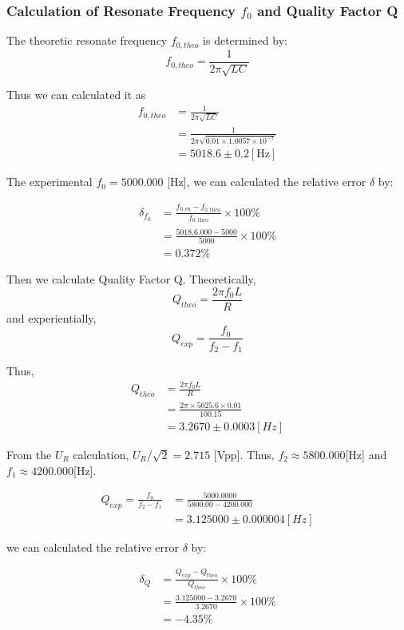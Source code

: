 \documentclass[a4paper]{article}
\begin{document}
\subsubsection{Calculation of Resonate Frequency $f_0$ and Quality Factor Q}

The theoretic resonate frequency $f_{0,theo}$ is determined by:
\begin{equation}
	f_{0,theo}=\frac{1}{2\pi \sqrt{LC}}
\end{equation}

Thus we can calculated it as
\begin{align*}
	f_{0,theo}
	 & =\frac{1}{2\pi \sqrt{LC}}                            \\
	 & =\frac{1}{2\pi\sqrt{0.01\times 1.0057\times10^{-7}}} \\
	 & =5018.6 \pm 0.2 [\text{Hz}]
\end{align*}

The experimental $f_0=5000.000$ [Hz], we can calculated the relative error $\delta$ by:

\begin{align*}
	\delta_{f_0}
	 & = \frac{f_{0,\text{ex}}-f_{0,\text{theo}}}{f_{0,\text{theo}}}\times 100\% \\
	 & = \frac{5018.6.000-5000}{5000}\times 100\%    \\
	 & = 0.372\%
\end{align*}

Then we calculate Quality Factor Q. Theoretically,
$$Q_{theo}=\frac{2\pi f_0 L}{R}$$
and experientially,
$$Q_{exp}=\frac{f_0}{f_2-f_1}$$

Thus,
\begin{align*}
	Q_{theo}
	 & =\frac{2\pi f_0 L}{R}                        \\
	 & =\frac{2\pi\times 5025.6\times 0.01}{100.15} \\
	 & =3.2670\pm 0.0003 [Hz]
\end{align*}

From the $U_R$ calculation, $U_R/\sqrt{2}=2.715$ [Vpp]. Thus, $f_2\approx 5800.000$[Hz] and $f_1\approx 4200.000$[Hz].

\begin{align*}
	Q_{exp}=\frac{f_0}{f_2-f_1}
	 & =\frac{5000.0000}{5800.00-4200.000} \\
	 & =3.125000\pm 0.000004 [Hz]
\end{align*}

we can calculated the relative error $\delta$ by:

\begin{align*}
	\delta_{Q}
	 & = \frac{Q_{exp}-Q_{theo}}{Q_{theo}}\times 100\% \\
	 & = \frac{3.125000-3.2670}{3.2670}\times 100\%    \\
	 & = -4.35\%
\end{align*}
\end{document}

